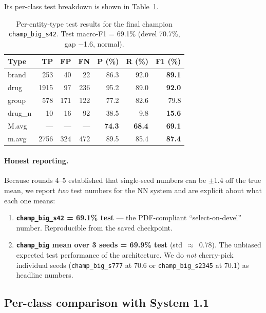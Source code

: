 \documentclass[a4paper,12pt]{article}
\begin{document}
Its per-class test breakdown is shown in
Table~\ref{tab:12-perclass}.

\begin{table}[H]
\centering
\small
\begin{tabular}{l r r r r r r}
\hline
\textbf{Type} & \textbf{TP} & \textbf{FP} & \textbf{FN} & \textbf{P (\%)} & \textbf{R (\%)} & \textbf{F1 (\%)} \\
\hline
brand  &  253 &  40 &  22 & 86.3 & 92.0 & \cellcolor{green!15}\textbf{89.1} \\
drug   & 1915 &  97 & 236 & 95.2 & 89.0 & \cellcolor{green!18}\textbf{92.0} \\
group  &  578 & 171 & 122 & 77.2 & 82.6 & 79.8 \\
drug\_n &   10 &  16 &  92 & 38.5 &  9.8 & \cellcolor{red!15}\textbf{15.6} \\
\hline
M.avg  & --- & --- & --- & \textbf{74.3} & \textbf{68.4} & \textbf{69.1} \\
m.avg  & 2756 & 324 & 472 & 89.5 & 85.4 & \cellcolor{green!18}\textbf{87.4} \\
\hline
\end{tabular}
\caption{Per-entity-type test results for the final champion
\texttt{champ\_big\_s42}. Test macro-F1 = 69.1\% (devel 70.7\%,
gap $-$1.6, normal).}
\label{tab:12-perclass}
\end{table}

\paragraph{Honest reporting.} Because rounds 4--5 established that
single-seed numbers can be $\pm$1.4 off the true mean, we report
\emph{two} test numbers for the NN system and are explicit about what
each one means:
\begin{enumerate}[nosep]
    \item \textbf{\texttt{champ\_big\_s42} = 69.1\% test} --- the
          PDF-compliant ``select-on-devel'' number. Reproducible from
          the saved checkpoint.
    \item \textbf{\texttt{champ\_big} mean over 3 seeds = 69.9\%
          test} (std~$\approx$~0.78). The unbiased expected test
          performance of the architecture. We do \emph{not} cherry-pick
          individual seeds (\texttt{champ\_big\_s777} at 70.6 or
          \texttt{champ\_big\_s2345} at 70.1) as headline numbers.
\end{enumerate}

\subsection{Per-class comparison with System 1.1}
\end{document}
